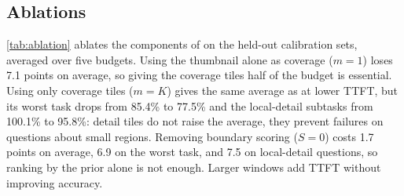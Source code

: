 \subsection{Ablations}
\label{sec:ablation}



\cref{tab:ablation} ablates the components of \method on the held-out calibration sets, averaged over
five budgets. Using the thumbnail alone as coverage ($m=1$) loses 7.1 points on average, so giving
the coverage tiles half of the budget is essential. Using only coverage tiles ($m=K$) gives the same average
as \method at lower TTFT, but its worst task drops from 85.4\% to 77.5\% and the local-detail subtasks
from 100.1\% to 95.8\%: detail tiles do not raise the average, they prevent failures on questions about
small regions. Removing boundary scoring ($S=0$) costs 1.7 points on average, 6.9 on the worst task, and
7.5 on local-detail questions, so ranking by the prior alone is not enough. Larger windows add TTFT
without improving accuracy.
